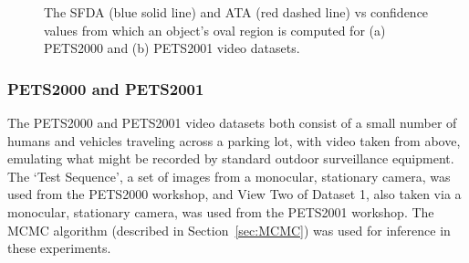 \documentclass{article}
\begin{document}
\begin{figure}[!]
  \centering             
   \hspace{1mm}
  \caption{The SFDA (blue solid line) and ATA (red dashed line) vs  confidence values from which an object's oval region is computed for (a) PETS2000 and (b) PETS2001 video datasets.}
  \label{fig:pm_conf}
\end{figure}


\subsubsection{PETS2000 and PETS2001}
\label{sec:pets2000and2001}

The PETS2000 and PETS2001 video datasets both consist of a small number of humans and vehicles traveling across a parking lot, with video taken from above, emulating what might be recorded by standard outdoor surveillance equipment. The `Test Sequence', a set of images from a monocular, stationary camera, was used from the PETS2000 workshop, and View Two of Dataset 1, also taken via a monocular, stationary camera, was used from the PETS2001 workshop. The MCMC algorithm (described in Section~\ref{sec:MCMC}) was used for inference in these experiments.
\end{document}

